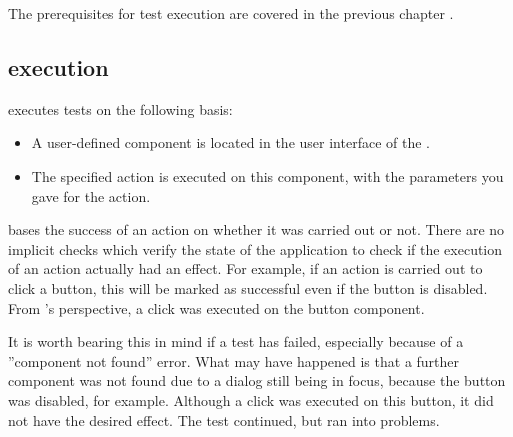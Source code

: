 
The prerequisites for test execution are covered in the previous chapter . 


\subsection{\gdstep{} execution}
\app{} executes tests on the following basis: 
\begin{itemize}
\item A user-defined component is located in the user interface of the \gdaut{}. 
\item The specified action is executed on this component, with the parameters you gave for the action. 
\end{itemize}

\app{} bases the success of an action on whether it was carried out or not. There are no implicit checks which verify the state of the application to check if the execution of an action actually had an effect. For example, if an action is carried out to click a button, this \gdstep{} will be marked as successful even if the button is disabled. From \app{}'s perspective, a click was executed on the button component. 

It is worth bearing this in mind if a test has failed, especially because of a ''component not found'' error. What may have happened is that a further component was not found due to a dialog still being in focus, because the  button  was disabled, for example. Although a click was executed on this button, it did not have the desired effect. The test continued, but ran into problems. 
